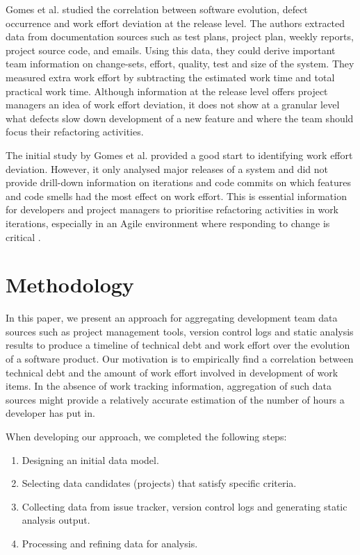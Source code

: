 \documentclass{mpaper}
\begin{document}
Gomes et al. \cite{Gomes2011} studied the correlation between software
evolution, defect occurrence and work effort deviation at the release level. The
authors extracted data from documentation sources such as test plans, project
plan, weekly reports, project source code, and emails. Using this data, they
could derive important team information on change-sets, effort, quality, test
and size of the system. They measured extra work effort by subtracting the
estimated work time and total practical work time. Although information at the
release level offers project managers an idea of work effort deviation, it does
not show at a granular level what defects slow down development of a new feature
and where the team should focus their refactoring activities.

The initial study by Gomes et al. \cite{Gomes2011} provided a good start to
identifying work effort deviation. However, it only analysed major releases of a
system and did not provide drill-down information on iterations and code commits
on which features and code smells had the most effect on work effort. This is
essential information for developers and project managers to prioritise
refactoring activities in work iterations, especially in an Agile environment
where responding to change is critical \cite{agile-manifesto}.

\section{Methodology}
\label{methodology}

In this paper, we present an approach for aggregating development team data
sources such as project management tools, version control logs and static
analysis results to produce a timeline of technical debt and work effort over
the evolution of a software product. Our motivation is to empirically find a
correlation between technical debt and the amount of work effort involved in
development of work items. In the absence of work tracking information,
aggregation of such data sources might provide a relatively accurate estimation
of the number of hours a developer has put in.

When developing our approach, we completed the following steps:
\begin{enumerate}
  \item Designing an initial data model.
  \item Selecting data candidates (projects) that satisfy specific criteria.
  \item Collecting data from issue tracker, version control logs and generating
  static analysis output.
  \item Processing and refining data for analysis. 
\end{enumerate}
\end{document}
